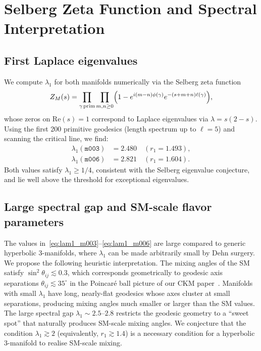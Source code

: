 \documentclass[a4paper,11pt]{article}
\newcommand{\mfld}[1]{\texttt{#1}}
\newcommand{\degr}{^{\circ}}
\begin{document}
\section{Selberg Zeta Function and Spectral Interpretation}
\label{sec:selberg}

\subsection{First Laplace eigenvalues}

We compute $\lambda_1$ for both manifolds numerically via the Selberg zeta
function~\cite{Selberg56}
\begin{equation}
  Z_M(s) = \prod_{\gamma\,\rm prim}\prod_{m,n\geq 0}
  \Bigl(1-e^{i(m-n)\phi(\gamma)}e^{-(s+m+n)\ell(\gamma)}\Bigr),
  \label{eq:selberg}
\end{equation}
whose zeros on $\mathrm{Re}(s)=1$ correspond to Laplace eigenvalues via
$\lambda = s(2-s)$.
Using the first 200 primitive geodesics (length spectrum up to $\ell=5$) and
scanning the critical line, we find:
\begin{align}
  \lambda_1(\mfld{m003}) &= 2.480 \quad (r_1=1.493), \label{eq:lam1_m003}\\
  \lambda_1(\mfld{m006}) &= 2.821 \quad (r_1=1.604). \label{eq:lam1_m006}
\end{align}
Both values satisfy $\lambda_1 \geq 1/4$, consistent with the Selberg eigenvalue
conjecture, and lie well above the threshold for exceptional eigenvalues.

\subsection{Large spectral gap and SM-scale flavor parameters}

The values in~\eqref{eq:lam1_m003}--\eqref{eq:lam1_m006} are large compared
to generic hyperbolic 3-manifolds, where $\lambda_1$ can be made arbitrarily
small by Dehn surgery.
We propose the following heuristic interpretation.
The mixing angles of the SM satisfy
$\sin^2\theta_{ij}\lesssim 0.3$, which corresponds geometrically to
geodesic axis separations $\theta_{ij}\lesssim 35\degr$ in the Poincar\'e
ball picture of our CKM paper~\cite{GentryCKM}.
Manifolds with small $\lambda_1$ have long, nearly-flat geodesics whose
axes cluster at small separations, producing mixing angles much smaller or
larger than the SM values.
The large spectral gap $\lambda_1\sim 2.5$--$2.8$ restricts the geodesic
geometry to a ``sweet spot'' that naturally produces SM-scale mixing angles.
We conjecture that the condition $\lambda_1\gtrsim 2$ (equivalently,
$r_1\gtrsim 1.4$) is a necessary condition for a hyperbolic 3-manifold to
realise SM-scale mixing.
\end{document}
